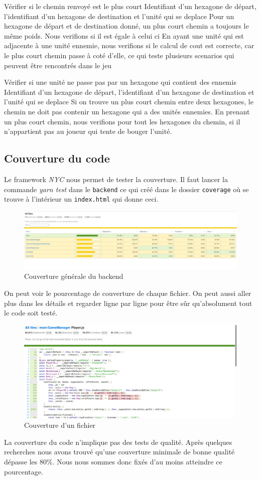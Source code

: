 \mytest
{Vérifier si le chemin renvoyé est le plus court}
{Identifiant d'un hexagone de départ, l'identifiant d'un hexagone de destination et l'unité qui se deplace}
{Pour un hexagone de départ et de destination donné, un plus court chemin a toujours le même poids. Nous verifions
si il est égale à celui ci}
{En ayant une unité qui est adjacente à une unité ennemie, nous verifions si le calcul de cout est correcte, car
le plus court chemin passe à coté d'elle, ce qui teste plusieurs scenarios qui peuvent être rencontrés dans le jeu}

\mytest
{Vérifier si une unité ne passe pas par un hexagone qui contient des ennemis}
{Identifiant d'un hexagone de départ, l'identifiant d'un hexagone de destination et l'unité qui se deplace}
{Si on trouve un plus court chemin entre deux hexagones, le chemin ne doit pas contenir un hexagone qui a des
unités ennemies.}
{En prenant un plus court chemin, nous verifions pour tout les hexagones du chemin, si il n'appartient pas
au joueur qui tente de bouger l'unité.}

\subsection{Couverture du code}

Le framework \emph{NYC} nous permet de tester la couverture. Il faut lancer la commande \emph{yarn test} dans le \lstinline{backend} ce qui créé dans le dossier \lstinline{coverage} où se trouve à l'intérieur un \lstinline{index.html} qui donne ceci.

\begin{figure}[H]
    \centering
    \includegraphics[scale=0.35]{data/couverture_test_1.jpg}
    \caption{Couverture générale du backend}
\end{figure}

On peut voir le pourcentage de couverture de chaque fichier. On peut aussi aller plus dans les détails et regarder ligne par ligne pour être sûr qu'absolument tout le code soit testé.

\begin{figure}[H]
    \centering
    \includegraphics[scale=0.3]{data/couverture_test_2.png}
    \caption{Couverture d'un fichier}
\end{figure}

La couverture du code n'implique pas des tests de qualité. Après quelques recherches nous avons trouvé qu'une couverture minimale de bonne qualité dépasse les 80\%. Nous nous sommes donc fixés d'au moins atteindre ce pourcentage.
